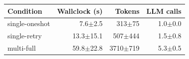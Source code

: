 \begin{tabular}{@{}lrrr@{}}
\toprule
Condition & Wallclock (s) & Tokens & LLM calls \\
\midrule
single-oneshot & 7.6$\pm$2.5 & 313$\pm$75 & 1.0$\pm$0.0 \\
single-retry & 13.3$\pm$15.1 & 507$\pm$444 & 1.5$\pm$0.8 \\
multi-full & 59.8$\pm$22.8 & 3710$\pm$719 & 5.3$\pm$0.5 \\
\bottomrule
\end{tabular}
